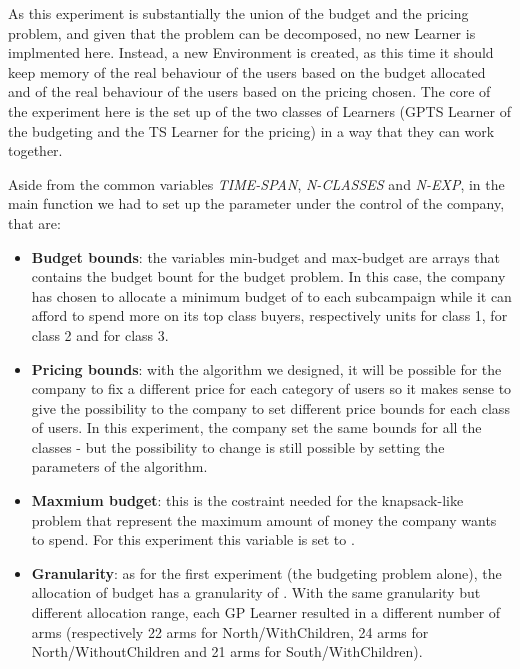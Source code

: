 As this experiment is substantially the union of the budget and the pricing problem, and given that the problem can be decomposed, no new Learner is implmented here. Instead, a new Environment is created, as this time it should keep memory of the real behaviour of the users based on the budget allocated and of the real behaviour of the users based on the pricing chosen. The core of the experiment here is the set up of the two classes of Learners (GPTS Learner of the budgeting and the TS Learner for the pricing) in a way that they can work together.

Aside from the common variables \textit{TIME-SPAN}, \textit{N-CLASSES} and \textit{N-EXP}, in the main function we had to set up the parameter under the control of the company, that are:

\begin{itemize}
	\item \textbf{Budget bounds}: the variables min-budget and max-budget are arrays that contains the budget bount for the budget problem. In this case, the company has chosen to allocate a minimum budget of  to each subcampaign while it can afford to spend more on its top class buyers, respectively  units for class 1,  for class 2 and  for class 3.
	\\\item \textbf{Pricing bounds}: with the algorithm we designed, it will be possible for the company to fix a different price for each category of users so it makes sense to give the possibility to the company to set different price bounds for each class of users. In this experiment, the company set the same bounds for all the classes - but the possibility to change is still possible by setting the parameters of the algorithm.
	\item \textbf{Maxmium budget}: this is the costraint needed for the knapsack-like problem that represent the maximum amount of money the company wants to spend. For this experiment this variable is set to .
	\item \textbf{Granularity}: as for the first experiment (the budgeting problem alone), the allocation of budget has a granularity of . With the same granularity but different allocation range, each GP Learner resulted in a different number of arms (respectively 22 arms for North/WithChildren, 24 arms for North/WithoutChildren and 21 arms for South/WithChildren).
\end{itemize}